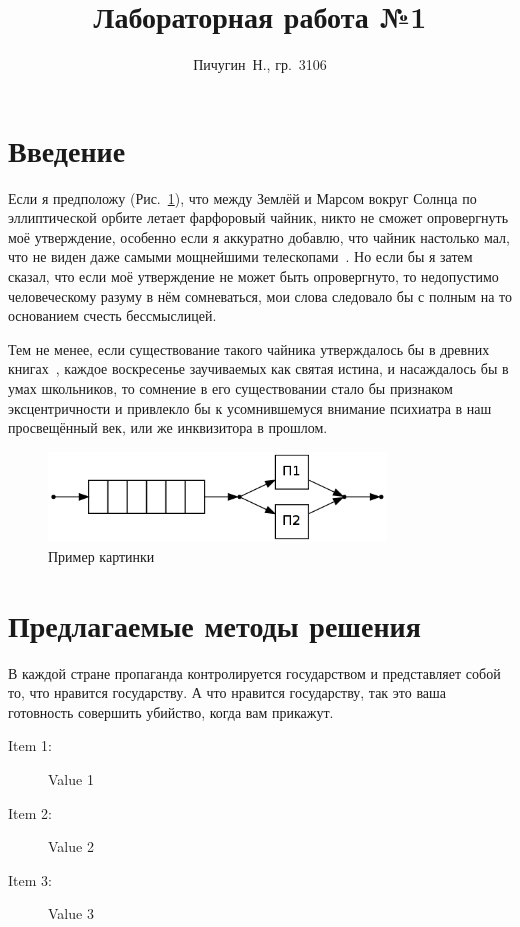 \documentclass[12pt, a4paper]{article}
\begin{document}
\title{Лабораторная работа №1}
\author{Пичугин~Н., гр.~3106}
\maketitle

\tableofcontents
\newpage

\section*{Введение}

Если я предположу (Рис.~\ref{fig:sample1}), что между Землёй и Марсом 
вокруг Солнца по эллиптической орбите летает фарфоровый чайник, никто не 
сможет опровергнуть моё утверждение, особенно если я аккуратно добавлю, что 
чайник настолько мал, что не виден даже самыми мощнейшими 
телескопами~\cite{kubensky}. Но если бы я затем сказал, что если моё 
утверждение не может быть опровергнуто, то недопустимо человеческому 
разуму в нём сомневаться, мои слова следовало бы с полным на то основанием 
счесть бессмыслицей.
\par
Тем не менее, если существование такого чайника утверждалось бы в древних 
книгах~\cite{landin}, каждое воскресенье заучиваемых как святая истина, и 
насаждалось бы в умах школьников, то сомнение в его существовании стало бы 
признаком эксцентричности и привлекло бы к усомнившемуся внимание 
психиатра в наш просвещённый век, или же инквизитора в прошлом.

\begin{figure}[H]
    \centering
    \includegraphics[width=0.8\textwidth]{sample1.png}
    \caption{Пример картинки}
    \label{fig:sample1}
\end{figure}

\section{Предлагаемые методы решения}
В каждой стране пропаганда контролируется государством и представляет 
собой то, что нравится государству. А что нравится государству, так это 
ваша готовность совершить убийство, когда вам прикажут.
\begin{description}  %
    \item[Item 1:] Value 1
    \item[Item 2:] Value 2
    \item[Item 3:] Value 3
\end{description}
\end{document}
